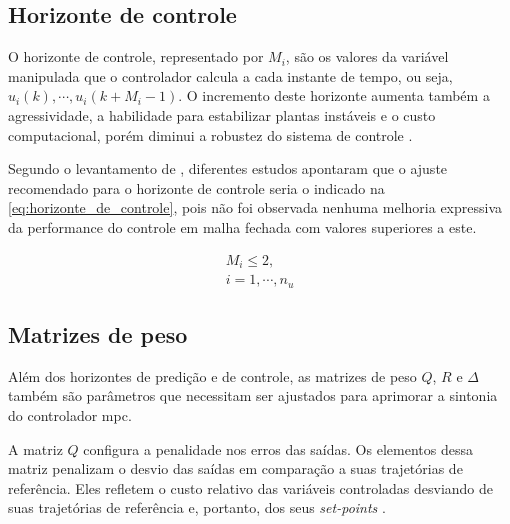 \subsection{Horizonte de controle}
\label{subsec:horizonte_de_controle}

O horizonte de controle, representado por $M_i$, são os valores da variável manipulada que o controlador
calcula a cada instante de tempo, ou seja, $u_i(k), \cdots, u_i(k+M_i-1)$. O incremento deste horizonte
aumenta também a agressividade, a habilidade para estabilizar plantas instáveis e o custo computacional,
porém diminui a robustez do sistema de controle \cite{Alhajeri2020}.

Segundo o levantamento de , diferentes estudos apontaram que o ajuste recomendado
para o horizonte de controle seria o indicado na \cref{eq:horizonte_de_controle}, pois não foi observada
nenhuma melhoria expressiva da performance do controle em malha fechada com valores superiores a este.

\begin{equation}
	\label{eq:horizonte_de_controle}
	\begin{aligned}
		M_i \leqslant 2,			\\
		i = 1, \cdots, n_u
	\end{aligned}
\end{equation}

\subsection{Matrizes de peso}
\label{subsec:matrizes_de_peso}

Além dos horizontes de predição e de controle, as matrizes de peso $Q$, $R$ e $\Delta$ também são parâmetros
que necessitam ser ajustados para aprimorar a sintonia do controlador \acrshort{mpc}.

A matriz $Q$ configura a penalidade nos erros das saídas. Os elementos dessa matriz penalizam o desvio 
das saídas em comparação a suas trajetórias de referência. Eles refletem o custo relativo das variáveis 
controladas desviando de suas trajetórias de referência e, portanto, dos seus \textit{set-points}
\cite{Alhajeri2020}.

